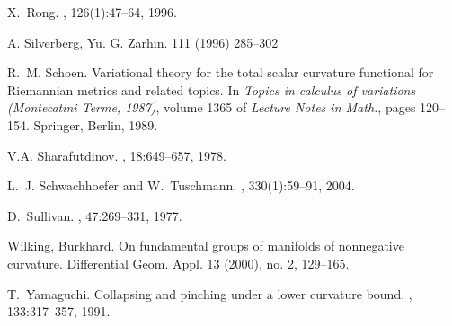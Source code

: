 \documentclass{amsart}
\begin{document}
\begin{thebibliography}{HMR75}
X.~Rong.
, 126(1):47--64, 1996.

A. Silverberg, Yu. G. Zarhin.  111 (1996) 285--302

R.~M. Schoen.
\newblock Variational theory for the total scalar curvature functional for
  Riemannian metrics and related topics.
\newblock In {\em Topics in calculus of variations (Montecatini Terme, 1987)},
  volume 1365 of {\em Lecture Notes in Math.}, pages 120--154. Springer,
  Berlin, 1989.

V.A. Sharafutdinov.
, 18:649--657, 1978.

L.~J. Schwachhoefer and W.~Tuschmann.
, 330(1):59--91, 2004.

D.~Sullivan.
, 47:269--331, 1977.

Wilking, Burkhard. \newblock On fundamental groups of manifolds of nonnegative curvature. \newblock  Differential Geom. Appl.  13  (2000),  no. 2, 129--165.

T.~Yamaguchi.
\newblock Collapsing and pinching under a lower curvature bound.
, 133:317--357, 1991.



\end{thebibliography}

\end{document}
